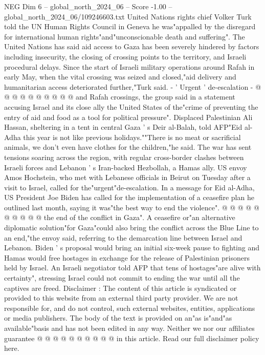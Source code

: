 \begin{textsample}{NEG Dim 6 – global\_north\_2024\_06 – Score -1.00 – global\_north\_2024\_06/109246603.txt}
United Nations rights chief Volker Turk told the UN Human Rights Council in Geneva he was"appalled by the disregard for international human rights"and"unconscionable death and suffering".
The United Nations has said aid access to Gaza has been severely hindered by factors including insecurity, the closing of crossing points to the territory, and Israeli procedural delays.
Since the start of Israeli military operations around Rafah in early May, when the vital crossing was seized and closed,"aid delivery and humanitarian access deteriorated further,"Turk said. - ' Urgent ' de-escalation - @ @ @ @ @ @ @ @ @ @ and Rafah crossings, the group said in a statement accusing Israel and its close ally the United States of the"crime of preventing the entry of aid and food as a tool for political pressure".
Displaced Palestinian Ali Hassan, sheltering in a tent in central Gaza ' s Deir al-Balah, told AFP"Eid al-Adha this year is not like previous holidays.""There is no meat or sacrificial animals, we don't even have clothes for the children,"he said.
The war has sent tensions soaring across the region, with regular cross-border clashes between Israeli forces and Lebanon ' s Iran-backed Hezbollah, a Hamas ally.
US envoy Amos Hochstein, who met with Lebanese officials in Beirut on Tuesday after a visit to Israel, called for the"urgent"de-escalation.
In a message for Eid al-Adha, US President Joe Biden has called for the implementation of a ceasefire plan he outlined last month, saying it was"the best way to end the violence". @ @ @ @ @ @ @ @ @ @ the end of the conflict in Gaza".
A ceasefire or"an alternative diplomatic solution"for Gaza"could also bring the conflict across the Blue Line to an end,"the envoy said, referring to the demarcation line between Israel and Lebanon.
Biden ' s proposal would bring an initial six-week pause to fighting and Hamas would free hostages in exchange for the release of Palestinian prisoners held by Israel.
An Israeli negotiator told AFP that tens of hostages"are alive with certainty", stressing Israel could not commit to ending the war until all the captives are freed.
Disclaimer : The content of this article is syndicated or provided to this website from an external third party provider.
We are not responsible for, and do not control, such external websites, entities, applications or media publishers.
The body of the text is provided on an"as is"and"as available"basis and has not been edited in any way.
Neither we nor our affiliates guarantee @ @ @ @ @ @ @ @ @ @ in this article.
Read our full disclaimer policy here.

\end{textsample}
